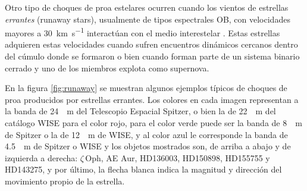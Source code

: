 Otro tipo de choques de proa estelares ocurren cuando los vientos de estrellas \textit{errantes} (runaway stars), usualmente de tipos espectrales OB, con velocidades mayores a \SI{30}{km.s^{-1}} interactúan con el medio interestelar \citep{Kobulnicky:2016}. Estas estrellas adquieren estas velocidades cuando sufren encuentros dinámicos cercanos dentro del cúmulo donde se formaron o bien cuando forman parte de un sistema binario cerrado y uno de los miembros explota como supernova.

En la figura \ref{fig:runaway} se muestran algunos ejemplos típicos de choques de proa producidos por estrellas errantes. Los colores en cada imagen representan a la banda de \SI{24}{\mu.m} del Telescopio Espacial Spitzer, o bien la de \SI{22}{\mu.m} del catálogo WISE para el color rojo, para el color verde puede ser la banda de \SI{8}{\mu.m} de Spitzer o la de \SI{12}{\mu.m} de WISE, y al color azul le corresponde la banda de \SI{4.5}{\mu.m} de Spitzer o WISE y los objetos mostrados son, de arriba a abajo y de izquierda a derecha: $\zeta$\,Oph, AE Aur, HD136003, HD150898, HD155755 y HD143275, y por último, la flecha blanca indica la magnitud y dirección del movimiento propio de la estrella.

